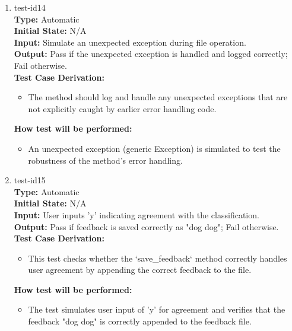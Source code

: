 \documentclass[12pt, titlepage]{article}
\begin{document}
\begin{enumerate}
\item{test-id14\\}
\textbf{Type:} Automatic\\
\textbf{Initial State:} N/A\\
\textbf{Input:} Simulate an unexpected exception during file operation.\\
\textbf{Output:} Pass if the unexpected exception is handled and logged 
correctly; Fail otherwise.\\
\textbf{Test Case Derivation:}
\begin{itemize}
    \item The method should log and handle any unexpected exceptions that 
    are not explicitly caught by earlier error handling code.
\end{itemize}
\textbf{How test will be performed:}
\begin{itemize}
    \item An unexpected exception (generic Exception) is simulated to test 
    the robustness of the method's error handling.
\end{itemize}
\item{test-id15\\}
\textbf{Type:} Automatic\\
\textbf{Initial State:} N/A\\
\textbf{Input:} User inputs 'y' indicating agreement with the classification.\\
\textbf{Output:} Pass if feedback is saved correctly as "dog dog"; Fail otherwise.\\
\textbf{Test Case Derivation:}
\begin{itemize}
    \item This test checks whether the `save\_feedback` method correctly handles 
    user agreement by appending the correct feedback to the file.
\end{itemize}
\textbf{How test will be performed:}
\begin{itemize}
    \item The test simulates user input of 'y' for agreement and verifies that 
    the feedback "dog dog" is correctly appended to the feedback file.
\end{itemize}


\end{enumerate}
\end{document}
